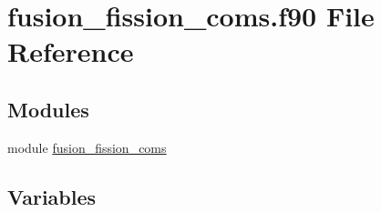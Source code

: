 \hypertarget{fusion__fission__coms_8f90}{}\section{fusion\+\_\+fission\+\_\+coms.\+f90 File Reference}
\label{fusion__fission__coms_8f90}
\subsection*{Modules}
\begin{DoxyCompactItemize}
\item 
module \hyperlink{namespacefusion__fission__coms}{fusion\+\_\+fission\+\_\+coms}
\end{DoxyCompactItemize}
\subsection*{Variables}
